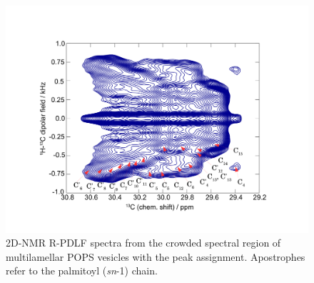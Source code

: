 \documentclass[journal=jctcce,manuscript=article]{achemso}
\begin{document}
\begin{figure}[!h] 
  \centering 
  \includegraphics[width=\textwidth]{../Fig/crowded_region.pdf}
  \caption{\label{R-PDLF}
    2D-NMR R-PDLF spectra from the crowded spectral region of multilamellar POPS vesicles with the peak
    assignment. Apostrophes refer to the palmitoyl ({\it sn}-1) chain.
  }
\end{figure}
\end{document}
